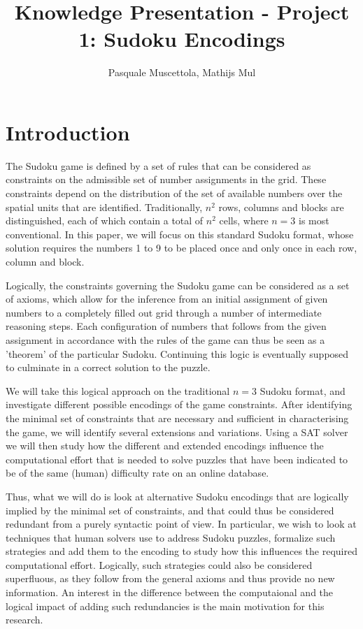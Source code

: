 \documentclass[10pt,a4paper,leqno]{article}
\begin{document}
\title{Knowledge Presentation - Project 1: Sudoku Encodings}
\author{Pasquale Muscettola, Mathijs Mul}
\maketitle

\section*{Introduction}

The Sudoku game is defined by a set of rules that can be considered as constraints on the admissible set of number assignments in the grid. These constraints depend on the distribution of the set of available numbers over the spatial units that are identified. Traditionally, $n^2$ rows, columns and blocks are distinguished, each of  which contain a total of $n^2$ cells, where $n =3$ is most conventional. In this paper, we will focus on this standard Sudoku format, whose solution requires the numbers 1 to 9 to be placed once and only once in each row, column and block. 

Logically, the constraints governing the Sudoku game can be considered as a set of axioms, which allow for the inference from an initial assignment of given numbers to a completely filled out grid through a number of intermediate reasoning steps. Each configuration of numbers that follows from the given assignment in accordance with the rules of the game can thus be seen as a 'theorem' of the particular Sudoku. Continuing this logic is eventually supposed to culminate in a correct solution to the puzzle.  

We will take this logical approach on the traditional $n = 3$ Sudoku format, and investigate different possible encodings of the game constraints. After identifying the minimal set of constraints that are necessary and sufficient in characterising the game, we will identify several extensions and variations. Using a SAT solver we will then study how the different and extended encodings influence the computational effort that is needed to solve puzzles that have been indicated to be of the same (human) difficulty rate on an online database. 

Thus, what we will do is look at alternative Sudoku encodings that are logically implied by the minimal set of constraints, and that could thus be considered redundant from a purely syntactic point of view. In particular, we wish to look at techniques that human solvers use to address Sudoku puzzles, formalize such strategies and add them to the encoding to study how this influences the required computational effort. Logically, such strategies could also be considered superfluous, as they follow from the general axioms and thus provide no new information. An interest in the difference between the computaional and the logical impact of adding such redundancies is the main motivation for this research. 
\end{document}
